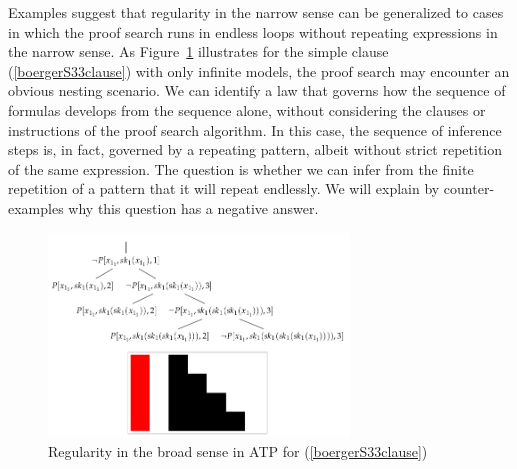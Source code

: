 \documentclass[%
  manuscript=article,   %
  year=2024,
  volume=77,
  doi=00000.000,
]{zfn}
\begin{document}
Examples suggest that regularity in the narrow sense can be generalized to cases in which the proof search runs in endless loops without repeating expressions in the narrow sense. As Figure~\ref{quine} illustrates for the simple clause (\ref{boergerS33clause}) with only infinite models, the proof search may encounter an obvious nesting scenario. We can identify a law that governs how the sequence of formulas develops from the sequence alone, without considering the clauses or instructions of the proof search algorithm. In this case, the sequence of inference steps is, in fact, governed by a repeating pattern, albeit without strict repetition of the same expression. The question is whether we can infer from the finite repetition of a pattern that it will repeat endlessly. We will explain by counter-examples why this question has a negative answer.

\begin{figure}[ht]
\begin{center}
\includegraphics[width=8cm]{ART_Lampert/fig2.png}
\end{center}
\caption{Regularity in the broad sense in ATP for (\ref{boergerS33clause})}
    \label{quine}
\end{figure}
\end{document}
